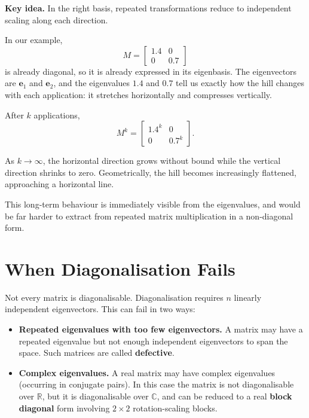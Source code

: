 \documentclass[11pt,openany]{book}
\theoremstyle{definition}
\begin{document}
\medskip

\textbf{Key idea.} In the right basis, repeated transformations reduce to independent scaling along each direction.

\medskip

In our example,
\[
M = \begin{bmatrix} 1.4 & 0 \\ 0 & 0.7 \end{bmatrix}
\]
is already diagonal, so it is already expressed in its eigenbasis. The eigenvectors 
are $\mathbf{e}_1$ and $\mathbf{e}_2$, and the eigenvalues $1.4$ and $0.7$ tell us 
exactly how the hill changes with each application: it stretches horizontally and 
compresses vertically.

\medskip

After $k$ applications,
\[
M^k = \begin{bmatrix} 1.4^k & 0 \\ 0 & 0.7^k \end{bmatrix}.
\]

\medskip

As $k \to \infty$, the horizontal direction grows without bound while the vertical 
direction shrinks to zero. Geometrically, the hill becomes increasingly flattened, 
approaching a horizontal line.

\medskip

This long-term behaviour is immediately visible from the eigenvalues, and would be 
far harder to extract from repeated matrix multiplication in a non-diagonal form.

\section{When Diagonalisation Fails}

Not every matrix is diagonalisable. Diagonalisation requires $n$ linearly 
independent eigenvectors. This can fail in two ways:

\begin{itemize}
  \item \textbf{Repeated eigenvalues with too few eigenvectors.} A matrix may 
  have a repeated eigenvalue but not enough independent eigenvectors to span the 
  space. Such matrices are called \textbf{defective}.
  \item \textbf{Complex eigenvalues.} A real matrix may have complex eigenvalues 
  (occurring in conjugate pairs). In this case the matrix is not diagonalisable 
  over $\mathbb{R}$, but it is diagonalisable over $\mathbb{C}$, and can be 
  reduced to a real \textbf{block diagonal} form involving $2\times 2$ rotation-scaling 
  blocks.
\end{itemize}
\end{document}
